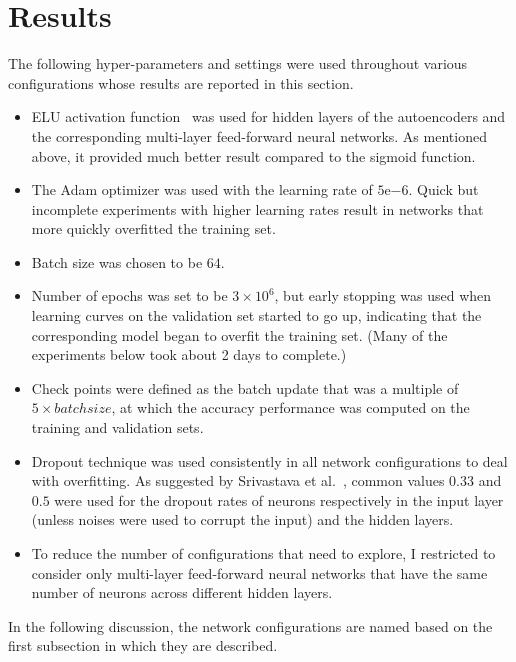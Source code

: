 \documentclass[12pt]{article}
\begin{document}

\section{Results}
\label{sec:results}

\noindent
The following hyper-parameters and settings were used throughout various configurations whose results are reported in this section.
\begin{itemize}
\item ELU activation function~\cite{clevert2015fast} was used for hidden layers of the autoencoders and the corresponding multi-layer feed-forward neural networks. As mentioned above, it provided much better result compared to the sigmoid function.
\item The Adam optimizer was used with the learning rate of $5\mathrm{e}{-6}$. Quick but incomplete experiments with higher learning rates result in networks that more quickly overfitted the training set.
\item Batch size was chosen to be $64$.
\item Number of epochs was set to be $3\times10^6$, but early stopping was used when learning curves on the validation set started to go up, indicating that the corresponding model began to overfit the training set. (Many of the experiments below took about 2 days to complete.)
\item Check points were defined as the batch update that was a multiple of $5 \times batchsize$, at which the accuracy performance was computed on the training and validation sets.
\item Dropout technique was used consistently in all network configurations to deal with overfitting. As suggested by Srivastava et al.~\cite{srivastava2014dropout}, common values $0.33$ and $0.5$ were used for the dropout rates of neurons respectively in the input layer (unless noises were used to corrupt the input) and the hidden layers.
\item To reduce the number of configurations that need to explore, I restricted to consider only multi-layer feed-forward neural networks that have the same number of neurons across different hidden layers.
\end{itemize}

In the following discussion, the network configurations are named based on the first subsection in which they are described.
\end{document}
